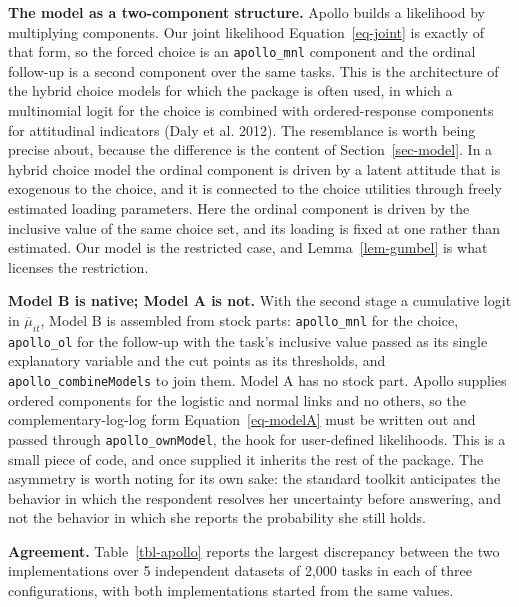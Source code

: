 \documentclass[
  letterpaper,
  DIV=11,
  numbers=noendperiod]{scrartcl}
\theoremstyle{plain}
\theoremstyle{plain}
\theoremstyle{remark}
\begin{document}
\textbf{The model as a two-component structure.} Apollo builds a
likelihood by multiplying components. Our joint likelihood
Equation~\ref{eq-joint} is exactly of that form, so the forced choice is
an \texttt{apollo\_mnl} component and the ordinal follow-up is a second
component over the same tasks. This is the architecture of the hybrid
choice models for which the package is often used, in which a
multinomial logit for the choice is combined with ordered-response
components for attitudinal indicators (Daly et al. 2012). The
resemblance is worth being precise about, because the difference is the
content of Section~\ref{sec-model}. In a hybrid choice model the ordinal
component is driven by a latent attitude that is exogenous to the
choice, and it is connected to the choice utilities through freely
estimated loading parameters. Here the ordinal component is driven by
the inclusive value of the same choice set, and its loading is fixed at
one rather than estimated. Our model is the restricted case, and
Lemma~\ref{lem-gumbel} is what licenses the restriction.

\textbf{Model B is native; Model A is not.} With the second stage a
cumulative logit in \(\overline{\mu}_{it}\), Model B is assembled from
stock parts: \texttt{apollo\_mnl} for the choice, \texttt{apollo\_ol}
for the follow-up with the task's inclusive value passed as its single
explanatory variable and the cut points as its thresholds, and
\texttt{apollo\_combineModels} to join them. Model A has no stock part.
Apollo supplies ordered components for the logistic and normal links and
no others, so the complementary-log-log form Equation~\ref{eq-modelA}
must be written out and passed through \texttt{apollo\_ownModel}, the
hook for user-defined likelihoods. This is a small piece of code, and
once supplied it inherits the rest of the package. The asymmetry is
worth noting for its own sake: the standard toolkit anticipates the
behavior in which the respondent resolves her uncertainty before
answering, and not the behavior in which she reports the probability she
still holds.

\textbf{Agreement.} Table~\ref{tbl-apollo} reports the largest
discrepancy between the two implementations over 5 independent datasets
of 2,000 tasks in each of three configurations, with both
implementations started from the same values.
\end{document}
